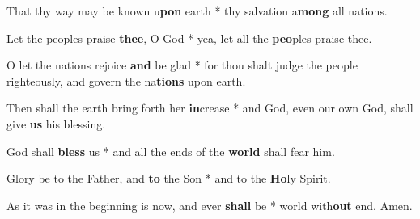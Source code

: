 \begin{multicols}{2}
	That thy way may be known u\textbf{pon} earth * thy salvation a\textbf{mong} all nations.
	
	Let the peoples praise \textbf{thee}, O God * yea, let all the \textbf{peo}ples praise thee.
	
	O let the nations rejoice \textbf{and} be glad * for thou shalt judge the people righteously, and govern the na\textbf{tions} upon earth.
	
	Then shall the earth bring forth her \textbf{in}crease * and God, even our own God, shall give \textbf{us} his blessing.
	
	God shall \textbf{bless} us * and all the ends of the \textbf{world} shall fear him.
	
	Glory be to the Father, and \textbf{to} the Son * and to the \textbf{Ho}ly Spirit.
	
	As it was in the beginning is now, and ever \textbf{shall} be * world with\textbf{out} end. Amen.
\end{multicols}